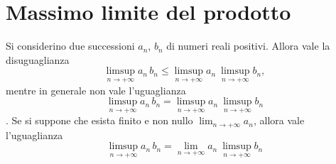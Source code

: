 \section{Massimo limite del prodotto}\label{prodottolimsup}
\begin{proposition}
Si considerino due successioni $a_n$, $b_n$ di numeri reali positivi.
Allora vale la disuguaglianza
\begin{equation}
	\limsup_{n\to +\infty} a_n\, b_n\leq  \limsup_{n\to +\infty} a_n\ \limsup_{n\to +\infty} b_n,
\end{equation}	
mentre in generale non vale l'uguaglianza 
\begin{equation}
	\limsup_{n\to +\infty} a_n\, b_n=  \limsup_{n\to +\infty} a_n\ \limsup_{n\to +\infty} b_n
\end{equation}.
Se si suppone che esista finito e non nullo $\displaystyle\lim_{n\to +\infty} a_n$, allora vale l'uguaglianza
\begin{equation*}
	\limsup_{n\to +\infty} a_n\, b_n= \lim_{n\to +\infty} a_n\ \limsup_{n\to +\infty} b_n
\end{equation*}
\end{proposition}
